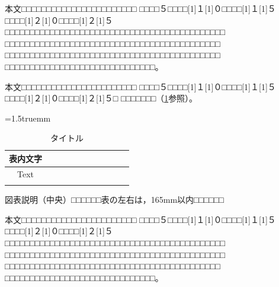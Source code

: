 \documentclass[fleqn]{ieej-report2}%
\def\tabref#1{\tablename\ref{#1}}
\begin{document}
本文□□□□□□□□□□□□□□□□□□□□□□□
□□□□５□□□□\scalebox{0.5}[1]{１}\scalebox{0.5}[1]{０}□□□□\scalebox{0.5}[1]{１}\scalebox{0.5}[1]{５}□□□□\scalebox{0.5}[1]{２}\scalebox{0.5}[1]{０}□□□□\scalebox{0.5}[1]{２}\scalebox{0.5}[1]{５}□□□□□□□□□□□□□□□□□□□□□□□□□□□□□□□□□□□□□□□□□□□□
□□□□□□□□□□□□□□□□□□□□□□□□□□□□□□□□□□□□□□□□□□□
□□□□□□□□□□□□□□□□□□□□□□□□□□□□□□□□□□□□□□□□□□□
□□□□□□□□□□□□□□□□□□□□□□□□□□□□□□。

本文□□□□□□□□□□□□□□□□□□□□□□□
□□□□５□□□□\scalebox{0.5}[1]{１}\scalebox{0.5}[1]{０}□□□□\scalebox{0.5}[1]{１}\scalebox{0.5}[1]{５}□□□□\scalebox{0.5}[1]{２}\scalebox{0.5}[1]{０}□□□□\scalebox{0.5}[1]{２}\scalebox{0.5}[1]{５}□
□□□□□□□（\tabref{tab:nidanfloat:example}参照）。

\begin{table}[t]
\centering
\caption{タイトル}
\label{tab:nidanfloat:example}
\tabcolsep=1.5truemm
\begin{tabular}{|c|c|c|c|c|c|c|c|c|c|c|}\hline
表内文字 & \hspace{4zw} &  \hspace{4zw} &  \hspace{4zw} &  \hspace{4zw} &  \hspace{4zw} &  \hspace{4zw} &  \hspace{4zw} &  \hspace{4zw} &  \hspace{4zw} &  \hspace{4zw} \\\hline
Text & & & & & & & & & & \\\hline
& & & & & & & & & & \\\hline
\end{tabular}
\par
\begin{minipage}{\hsize}
\scriptsize\centering%
図表説明（中央）□□□□□□表の左右は，165mm以内□□□□□□
\end{minipage}
\end{table}

本文□□□□□□□□□□□□□□□□□□□□□□□
□□□□５□□□□\scalebox{0.5}[1]{１}\scalebox{0.5}[1]{０}□□□□\scalebox{0.5}[1]{１}\scalebox{0.5}[1]{５}□□□□\scalebox{0.5}[1]{２}\scalebox{0.5}[1]{０}□□□□\scalebox{0.5}[1]{２}\scalebox{0.5}[1]{５}□□□□□□□□□□□□□□□□□□□□□□□□□□□□□□□□□□□□□□□□□□□□
□□□□□□□□□□□□□□□□□□□□□□□□□□□□□□□□□□□□□□□□□□□□
□□□□□□□□□□□□□□□□□□□□□□□□□□□□□□□□□□□□□□□□□□□
□□□□□□□□□□□□□□□□□□□□□□□□□□□□□□。
\end{document}

